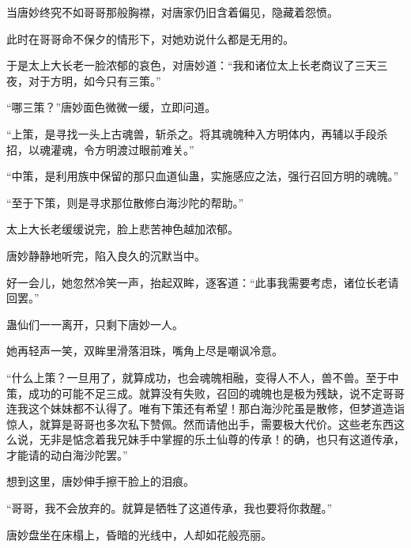 \begin{this_body}
当唐妙终究不如哥哥那般胸襟，对唐家仍旧含着偏见，隐藏着怨愤。

此时在哥哥命不保夕的情形下，对她劝说什么都是无用的。

于是太上大长老一脸浓郁的哀色，对唐妙道：“我和诸位太上长老商议了三天三夜，对于方明，如今只有三策。”

“哪三策？”唐妙面色微微一缓，立即问道。

“上策，是寻找一头上古魂兽，斩杀之。将其魂魄种入方明体内，再辅以手段杀招，以魂灌魂，令方明渡过眼前难关。”

“中策，是利用族中保留的那只血道仙蛊，实施感应之法，强行召回方明的魂魄。”

“至于下策，则是寻求那位散修白海沙陀的帮助。”

太上大长老缓缓说完，脸上悲苦神色越加浓郁。

唐妙静静地听完，陷入良久的沉默当中。

好一会儿，她忽然冷笑一声，抬起双眸，逐客道：“此事我需要考虑，诸位长老请回罢。”

蛊仙们一一离开，只剩下唐妙一人。

她再轻声一笑，双眸里滑落泪珠，嘴角上尽是嘲讽冷意。

“什么上策？一旦用了，就算成功，也会魂魄相融，变得人不人，兽不兽。至于中策，成功的可能不足三成。就算没有失败，召回的魂魄也是极为残缺，说不定哥哥连我这个妹妹都不认得了。唯有下策还有希望！那白海沙陀虽是散修，但梦道造诣惊人，就算是哥哥也多次私下赞佩。然而请他出手，需要极大代价。这些老东西这么说，无非是惦念着我兄妹手中掌握的乐土仙尊的传承！的确，也只有这道传承，才能请的动白海沙陀罢。”

想到这里，唐妙伸手擦干脸上的泪痕。

“哥哥，我不会放弃的。就算是牺牲了这道传承，我也要将你救醒。”

唐妙盘坐在床榻上，昏暗的光线中，人却如花般亮丽。

\end{this_body}


